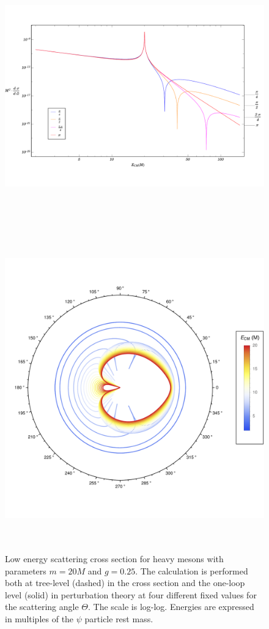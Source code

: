 \documentclass{article}
\begin{document}
\begin{figure}
\begin{center}
\vspace*{-2.5cm}
\includegraphics[width=15cm, height=11cm]{HighMass-UnStableMeson-HighEnergy}
\vspace*{-0.5cm}
\caption{Low energy scattering cross section for heavy mesons with parameters $m = 20 M$ and $g = 0.25$. The calculation is performed both at tree-level (dashed) in the cross section and the one-loop level (solid) in perturbation theory at four different fixed values for the scattering angle $\Theta$. The scale is log-log. Energies are expressed in multiples of the $\psi$ particle rest mass.} 
\label{HighMassUnStabHighEnergy}
\vspace*{-0.5cm}
\includegraphics[width=14cm, height=14cm]{UnStableMeson-LowEnergy-Polar}

\end{center}
\end{figure}
\end{document}
